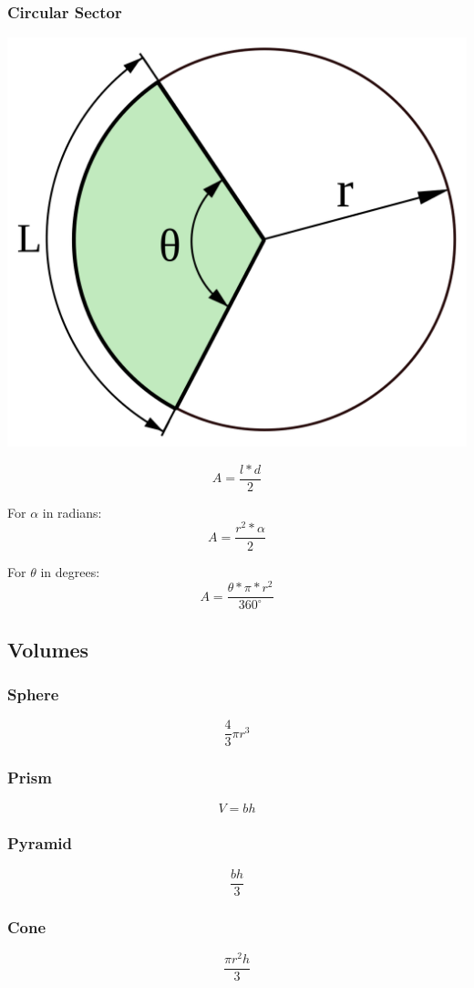\subsubsection{Circular Sector}
\begin{center}
    \includegraphics[scale=.2, keepaspectratio]{./Theory/images/circularsector.png}
\end{center}

$$ A = \dfrac{l * d}{2} $$

For $\alpha$ in radians:
$$ A = \dfrac{r^{2} * \alpha}{2} $$

For $\theta$ in degrees:
$$ A = \dfrac{\theta * \pi * r^{2}}{360^{\circ}} $$

\subsection{Volumes}
\subsubsection{Sphere}
$$ \dfrac{4}{3} \pi r^3 $$
\subsubsection{Prism}
$$ V = b h $$
\subsubsection{Pyramid}
$$ \dfrac{bh}{3} $$
\subsubsection{Cone}
$$ \dfrac{\pi r^2 h}{3} $$
